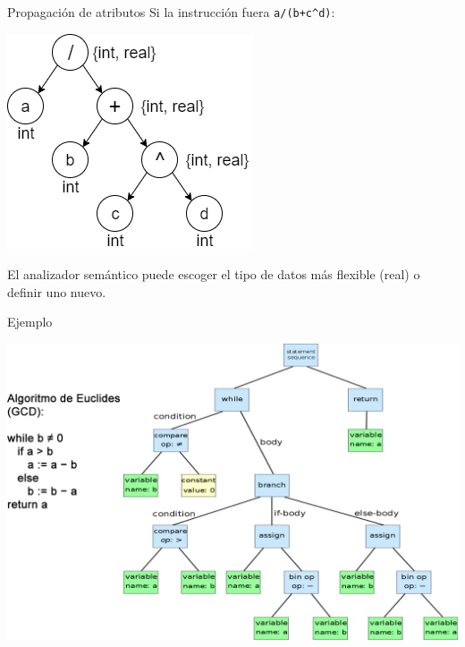 \documentclass[handout]{beamer} %
\begin{document}
\begin{frame}{Propagación de atributos}
    Si la instrucción fuera \texttt{a/(b+c\string^d)}:\\
    \begin{center}
    \includegraphics[width=.5\textwidth]{./image/cap3/AST-5}
    \end{center}
    El analizador semántico puede escoger el tipo de datos más flexible (real) o definir uno nuevo.
\end{frame}

\begin{frame}{Ejemplo}
    \begin{center}
    \includegraphics[width=\textwidth]{./image/cap3/AST-euclidean}
    \end{center}
\end{frame}

\end{document}
